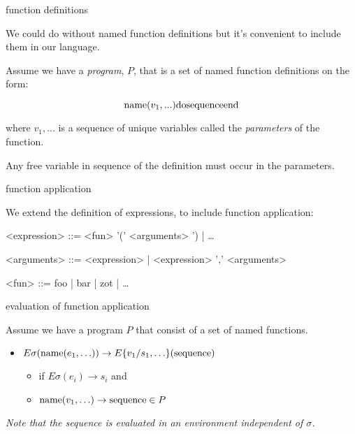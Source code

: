  

\begin{frame}{function definitions}

We could do without named  function definitions  but it's convenient to include them in our language. 

\vspace{20pt}

Assume we have a {\em program}, $P$, that is a set of named function definitions on the form:

  $${\rm name}(v_1, ...) {\rm do}  {\rm sequence}  {\rm end}$$

where $v_1, ...$ is a sequence of unique variables called the {\em parameters} of the function. 

\pause \vspace{20pt}

Any free variable in sequence of the definition must occur in the parameters.

\end{frame}

\begin{frame}{function application}

We extend the definition of expressions, to include function application:

\pause
\begin{grammar}
<expression> ::= <fun> '(' <arguments> ') | \ldots

<arguments> ::= <expression> | <expression> ',' <arguments>

<fun> ::=  foo | bar | zot | \ldots
\end{grammar}


\end{frame}


\begin{frame}{evaluation of function application}

Assume we have a program $P$ that consist of a set of named functions. 

 \begin{itemize} 
  \pause\item $E\sigma({\rm name}(e_1, \ldots)) \rightarrow E\{v_1/s_1, \ldots\}({\rm sequence} )$ 
   \begin{itemize}        
           \pause\item if $E\sigma(e_i) \rightarrow s_i$ and 
           \pause\item ${\rm name}(v_1, \ldots) \rightarrow  {\rm sequence}  \in P$ 
    \end{itemize} 
 \end{itemize} 

\pause\vspace{20pt}

{\em Note that the sequence is evaluated in an environment independent of $\sigma$.}

\end{frame}

